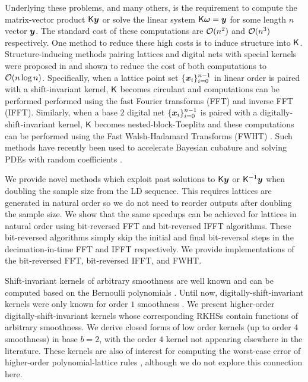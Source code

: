 \documentclass[acmsmall]{acmart}
\newcommand{\FJHNote}[1]{\textcolor{blue}{#1}}
\begin{document}
Underlying these problems, and many others, is the requirement to compute the matrix-vector product ${\mathsf{K}} {\boldsymbol{y}}$ or solve the linear system ${\mathsf{K}} \boldsymbol{\omega} ={\boldsymbol{y}}$ for some length $n$ vector ${\boldsymbol{y}}$.
The standard cost of these computations are ${\mathcal{O}}(n^2)$ and ${\mathcal{O}}(n^3)$ respectively. One method to reduce these high costs is to induce structure into ${\mathsf{K}}$. Structure-inducing methods pairing lattices and digital nets with special kernels were proposed in \citep{zeng.spline_lattice_digital_net} and shown to reduce the cost of both computations to ${\mathcal{O}}(n \log n)$. Specifically, when a lattice point set $\{{\boldsymbol{x}}_i\}_{i=0}^{n-1}$ in linear order is paired with a shift-invariant kernel, ${\mathsf{K}}$ becomes circulant and computations can be performed performed using the fast Fourier transforms (FFT) and inverse FFT (IFFT). Similarly, when a base $2$ digital net $\{{\boldsymbol{x}}_i\}_{i=0}^{n-1}$ is paired with a digitally-shift-invariant kernel, ${\mathsf{K}}$ becomes nested-block-Toeplitz and these computations can be performed using the Fast Walsh-Hadamard Transforms (FWHT) \citep{fino.fwht}. Such methods have recently been used to accelerate Bayesian cubature \citep{rathinavel.bayesian_QMC_lattice,rathinavel.bayesian_QMC_sobol,rathinavel.bayesian_QMC_thesis} and solving PDEs with random coefficients \citep{kaarnioja.kernel_interpolants_lattice_rkhs,kaarnioja.kernel_interpolants_lattice_rkhs_serendipitous}.

We provide novel methods which exploit past solutions to ${\mathsf{K}}{\boldsymbol{y}}$ or ${\mathsf{K}}^{-1}{\boldsymbol{y}}$ when doubling the sample size from the LD sequence. This requires lattices are generated in natural order so we do not need to reorder outputs after doubling the sample size. We show that the same speedups can be achieved for lattices in natural order using bit-reversed FFT and bit-reversed IFFT algorithms. These bit-reversed algorithms simply skip the initial and final bit-reversal steps in the decimation-in-time FFT and IFFT respectively. We provide implementations of the bit-reversed FFT, bit-reversed IFFT, and FWHT. 

Shift-invariant kernels of arbitrary smoothness are well known and can be computed based on the Bernoulli polynomials \citep{kaarnioja.kernel_interpolants_lattice_rkhs,kaarnioja.kernel_interpolants_lattice_rkhs_serendipitous,cools2021fast,cools2020lattice,sloan2001tractability,kuo2004lattice}. Until now, digitally-shift-invariant kernels were only known for order $1$ smoothness \citep{dick.multivariate_integraion_sobolev_spaces_digital_nets}. We present higher-order digitally-shift-invariant kernels whose corresponding RKHSs contain functions of arbitrary smoothness. We derive closed forms of low order kernels (up to order $4$ smoothness) in base $b=2$, with the order $4$ kernel not appearing elsewhere in the literature. These kernels are also of interest for computing the worst-case error of higher-order polynomial-lattice rules \cite{baldeaux.polylat_efficient_comp_worse_case_error_cbc}, although we do not explore this connection here. 
\end{document}
